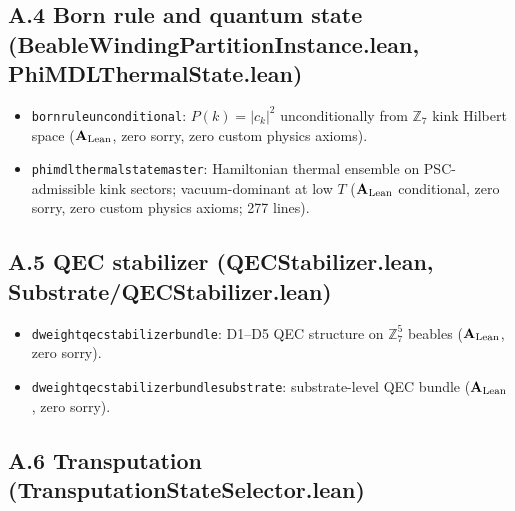 \documentclass[11pt]{article}
\theoremstyle{remark}
\newcommand{\ZS}{\mathbb{Z}_7}
\newcommand{\lean}[1]{%
  \penalty-100
  \begingroup\def\_{\textunderscore\allowbreak}\texttt{#1}\endgroup}
\newcommand{\CatAL}{\ensuremath{\textbf{A}_{\rm Lean}}}
\begin{document}
\begin{appendices}
\subsection*{A.4 Born rule and quantum state (BeableWindingPartitionInstance.lean, PhiMDLThermalState.lean)}

\begin{itemize}[noitemsep]
\item \lean{born\_rule\_unconditional}: $P(k)=|c_k|^2$ unconditionally from
  $\ZS$ kink Hilbert space ($\CatAL$, zero sorry, zero custom physics axioms).
\item \lean{phimdl\_thermal\_state\_master}: Hamiltonian thermal ensemble on
  PSC-admissible kink sectors; vacuum-dominant at low $T$ ($\CatAL$
  conditional, zero sorry, zero custom physics axioms; 277 lines).
\end{itemize}

\subsection*{A.5 QEC stabilizer (QECStabilizer.lean, Substrate/QECStabilizer.lean)}

\begin{itemize}[noitemsep]
\item \lean{dweight\_qec\_stabilizer\_bundle}: D1–D5 QEC structure on $\ZS^5$
  beables ($\CatAL$, zero sorry).
\item \lean{dweight\_qec\_stabilizer\_bundle\_substrate}: substrate-level
  QEC bundle ($\CatAL$, zero sorry).
\end{itemize}

\subsection*{A.6 Transputation (TransputationStateSelector.lean)}


\end{appendices}
\end{document}
